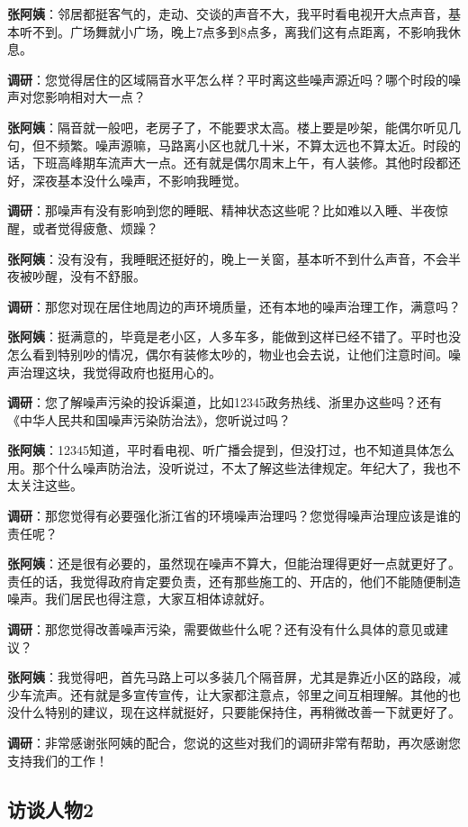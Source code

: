 \begin{appendices}
\textbf{张阿姨}：邻居都挺客气的，走动、交谈的声音不大，我平时看电视开大点声音，基本听不到。广场舞就小广场，晚上7点多到8点多，离我们这有点距离，不影响我休息。

\textbf{调研}：您觉得居住的区域隔音水平怎么样？平时离这些噪声源近吗？哪个时段的噪声对您影响相对大一点？

\textbf{张阿姨}：隔音就一般吧，老房子了，不能要求太高。楼上要是吵架，能偶尔听见几句，但不频繁。噪声源嘛，马路离小区也就几十米，不算太远也不算太近。时段的话，下班高峰期车流声大一点。还有就是偶尔周末上午，有人装修。其他时段都还好，深夜基本没什么噪声，不影响我睡觉。

\textbf{调研}：那噪声有没有影响到您的睡眠、精神状态这些呢？比如难以入睡、半夜惊醒，或者觉得疲惫、烦躁？

\textbf{张阿姨}：没有没有，我睡眠还挺好的，晚上一关窗，基本听不到什么声音，不会半夜被吵醒，没有不舒服。

\textbf{调研}：那您对现在居住地周边的声环境质量，还有本地的噪声治理工作，满意吗？

\textbf{张阿姨}：挺满意的，毕竟是老小区，人多车多，能做到这样已经不错了。平时也没怎么看到特别吵的情况，偶尔有装修太吵的，物业也会去说，让他们注意时间。噪声治理这块，我觉得政府也挺用心的。

\textbf{调研}：您了解噪声污染的投诉渠道，比如12345政务热线、浙里办这些吗？还有《中华人民共和国噪声污染防治法》，您听说过吗？

\textbf{张阿姨}：12345知道，平时看电视、听广播会提到，但没打过，也不知道具体怎么用。那个什么噪声防治法，没听说过，不太了解这些法律规定。年纪大了，我也不太关注这些。

\textbf{调研}：那您觉得有必要强化浙江省的环境噪声治理吗？您觉得噪声治理应该是谁的责任呢？

\textbf{张阿姨}：还是很有必要的，虽然现在噪声不算大，但能治理得更好一点就更好了。责任的话，我觉得政府肯定要负责，还有那些施工的、开店的，他们不能随便制造噪声。我们居民也得注意，大家互相体谅就好。

\textbf{调研}：那您觉得改善噪声污染，需要做些什么呢？还有没有什么具体的意见或建议？

\textbf{张阿姨}：我觉得吧，首先马路上可以多装几个隔音屏，尤其是靠近小区的路段，减少车流声。还有就是多宣传宣传，让大家都注意点，邻里之间互相理解。其他的也没什么特别的建议，现在这样就挺好，只要能保持住，再稍微改善一下就更好了。

\textbf{调研}：非常感谢张阿姨的配合，您说的这些对我们的调研非常有帮助，再次感谢您支持我们的工作！

\subsection{访谈人物2}


\end{appendices}

